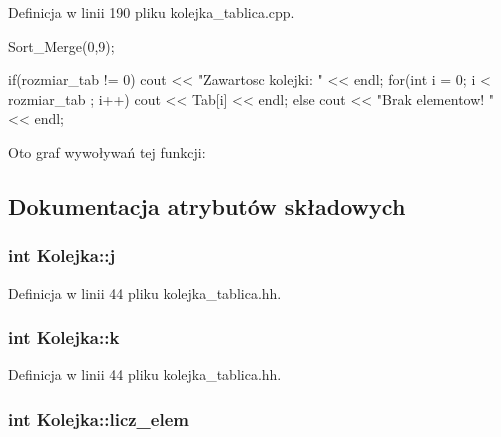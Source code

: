 \-Definicja w linii 190 pliku kolejka\-\_\-tablica.\-cpp.


\begin{DoxyCode}
{       
        Sort_Merge(0,9);

        if(rozmiar_tab != 0)
        {
                cout << "Zawartosc kolejki:  " << endl;
                for(int i = 0; i < rozmiar_tab ; i++)
                {
                        cout << Tab[i] << endl;
                }
        } 
        else
                cout << "Brak elementow! " << endl;
}
\end{DoxyCode}


\-Oto graf wywoływań tej funkcji\-:




\subsection{\-Dokumentacja atrybutów składowych}
\hypertarget{class_kolejka_a7eef5cf96ca7f8178dfc9ae5ad02417d}{
\subsubsection[{j}]{\setlength{\rightskip}{0pt plus 5cm}int {\bf \-Kolejka\-::j}}}\label{class_kolejka_a7eef5cf96ca7f8178dfc9ae5ad02417d}


\-Definicja w linii 44 pliku kolejka\-\_\-tablica.\-hh.

\hypertarget{class_kolejka_a859e9504347a642ed42c65d1aadee0a1}{
\subsubsection[{k}]{\setlength{\rightskip}{0pt plus 5cm}int {\bf \-Kolejka\-::k}}}\label{class_kolejka_a859e9504347a642ed42c65d1aadee0a1}


\-Definicja w linii 44 pliku kolejka\-\_\-tablica.\-hh.

\hypertarget{class_kolejka_a563cd8e3ecaf570a6f8068db62d6c099}{
\subsubsection[{licz\-\_\-elem}]{\setlength{\rightskip}{0pt plus 5cm}int {\bf \-Kolejka\-::licz\-\_\-elem}}}\label{class_kolejka_a563cd8e3ecaf570a6f8068db62d6c099}


